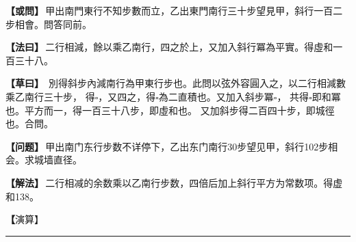 \documentclass[11pt,a4paper]{article}
\let\origsquare\square
\renewcommand{\square}{\ensuremath{\origsquare}}%
\newcommand{\longline}{\noindent\rule{\textwidth}{0.4pt}}
\newcommand{\clOWEN}[1]{%
  \par\vspace{0.3em}%
  \noindent\textcolor{problemcolor}{\textbf{【或問】}}\,{\tradfont #1}\par\nopagebreak%
}
\newcommand{\mdOWEN}[1]{%
  \par\vspace{0.3em}%
  \noindent\textcolor{problemcolor}{\textbf{【问题】}}\,{\modfont #1}\par\nopagebreak%
}
\newcommand{\clFAYUE}[1]{%
  \par\noindent\textcolor{methodcolor}{\textbf{【法曰】}}\,{\tradfont #1}\par\nopagebreak%
}
\newcommand{\mdFAYUE}[1]{%
  \par\noindent\textcolor{methodcolor}{\textbf{【解法】}}\,{\modfont #1}\par\nopagebreak%
}
\newcommand{\clTSAOYUE}[1]{%
  \par\noindent\textcolor{workcolor}{\textbf{【草曰】}}\,{\tradfont #1}\par%
}
\newcommand{\mdTSAOYUE}[1]{%
  \par\noindent\textcolor{workcolor}{\textbf【演算】}}\,{\modfont #1}\par%
\begin{document}
\begin{paracol}{2}

\begin{leftcolumn}
\clOWEN{甲出南門東行不知步數而立，乙出東門南行三十步望見甲，斜行一百二步相會。問答同前。}

\clFAYUE{二行相減，餘以乘乙南行，四之於上，又加入斜行冪為平實。得虛和一百三十八。}

\clTSAOYUE{%
別得斜步內減南行為甲東行步也。此問以弦外容圓入之，以二行相減數乘乙南行三十步，
得$\square$，又四之，得$\square$為二直積也。又加入斜步冪$\square$，
共得$\square$即和冪也。平方而一，得一百三十八步，即虛和也。
又加斜步得二百四十步，即城徑也。合問。}
\end{leftcolumn}

\switchcolumn

\begin{rightcolumn}
\mdOWEN{甲出南门东行步数不详停下，乙出东门南行30步望见甲，斜行102步相会。求城墙直径。}

\mdFAYUE{二行相减的余数乘以乙南行步数，四倍后加上斜行平方为常数项。得虚和138。}

\mdTSAOYUE{%
辨识得：斜步减去南行即为甲东行步数。此题以弦外容圆理解，以二行相减数乘乙南行30步，
得$\square$，再四倍得$\square$为两倍直积。加入斜步冪$\square$，
共得$\square$即和冪。开平方得138步，即虚和。
加上斜步得240步，即城径。符合所问。}
\end{rightcolumn}

\end{paracol}

\vspace{0.3cm}
\begin{center}\longline\end{center}
\end{document}
